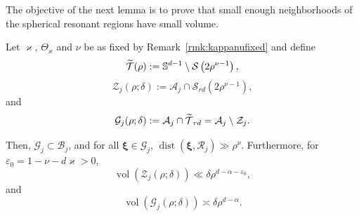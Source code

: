 \documentclass[AHL,Unicode,longabstracts,published]{cedram}
\DeclareMathOperator{\vol}{vol}
\DeclareMathOperator{\dist}{dist}
\newcommand{\BBS}{\mathbb S}
\newcommand{\CA}{\mathcal{A}}
\newcommand{\CB}{\mathcal{B}}
\newcommand{\CG}{\mathcal{G}}
\newcommand{\CR}{\mathcal{R}}
\newcommand{\CS}{\mathcal{S}}
\newcommand{\CT}{\mathcal{T}}
\newcommand{\CZ}{\mathcal{Z}}
\newcommand{\bxi}{\boldsymbol \xi}
\newcommand{\eps}{\varepsilon}
\let\oldtilde\tilde
\renewcommand*{\tilde}[1]{\mathchoice{\widetilde{#1}}{\widetilde{#1}}{\oldtilde{#1}}{\oldtilde{#1}}}
\begin{document}
The objective of the next lemma is to prove that small enough neighborhoods of the spherical resonant regions have small volume.
\begin{lemm} \label{lem:enlargedresonant}
Let $\varkappa$, $\Theta_\varkappa$ and $\nu$ be as fixed by Remark~\ref{rmk:kappanufixed} and define
\begin{equation}
\tilde \CT(\rho) := \BBS^{d-1} \setminus \CS\left(2 \rho^{\nu-1}\right),
\end{equation}
\begin{equation}\label{eq:czjsub}
\CZ_j(\rho;\delta) := \CA_j \cap \CS_{rd}\left(2\rho^{\nu-1}\right),
\end{equation}
and
\begin{equation}\label{eq:cgjsub}
\CG_j(\rho;\delta) := \CA_j \cap \tilde \CT_{rd} = \CA_j \setminus \CZ_j.
\end{equation}

Then, $\CG_j \subset \CB_j$, and for all $\bxi \in \CG_j$, $\dist(\bxi,\CR_j)\gg
\rho^{\nu}$. Furthermore, for $\eps_0 = 1 - \nu - d \varkappa > 0$,
\begin{equation}\label{eq:volCZ}
\vol(\CZ_j(\rho;\delta)) \ll \delta \rho^{d - \alpha - \eps_0},
\end{equation}
and
\begin{equation}\label{eq:voltCG}
\vol(\CG_j(\rho;\delta)) \asymp \delta \rho^{d - \alpha}.
\end{equation}
\end{lemm}
\end{document}
